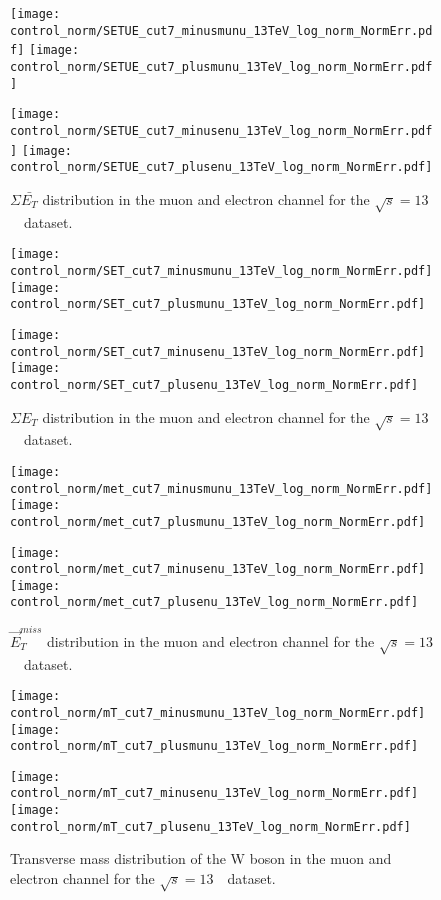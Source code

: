 \begin{figure}[h]
	\centering
	{\texttt{[image: control\_norm/SETUE\_cut7\_minusmunu\_13TeV\_log\_norm\_NormErr.pdf]}\label{f:SETUEmm13}}
	{\texttt{[image: control\_norm/SETUE\_cut7\_plusmunu\_13TeV\_log\_norm\_NormErr.pdf]}\label{f:SETUEpm13}}
	
	{\texttt{[image: control\_norm/SETUE\_cut7\_minusenu\_13TeV\_log\_norm\_NormErr.pdf]}\label{f:}}
	{\texttt{[image: control\_norm/SETUE\_cut7\_plusenu\_13TeV\_log\_norm\_NormErr.pdf]}\label{f:}}
	\caption{$\Sigma \bar{E_T}$ distribution in the muon and electron channel  for the $\sqrt{s} = 13$~\TeV\ dataset.}\end{figure}
%

\begin{figure}[h]
	\centering
	{\texttt{[image: control\_norm/SET\_cut7\_minusmunu\_13TeV\_log\_norm\_NormErr.pdf]}\label{f:set13}}
	{\texttt{[image: control\_norm/SET\_cut7\_plusmunu\_13TeV\_log\_norm\_NormErr.pdf]}\label{f:setpl}}
	
	{\texttt{[image: control\_norm/SET\_cut7\_minusenu\_13TeV\_log\_norm\_NormErr.pdf]}\label{f:}}
	{\texttt{[image: control\_norm/SET\_cut7\_plusenu\_13TeV\_log\_norm\_NormErr.pdf]}\label{f:}}
	\caption{$\Sigma{E_T}$ distribution in the muon and electron channel  for the $\sqrt{s} = 13$~\TeV\ dataset.}\end{figure}



\begin{figure}[h]
	\centering
	{\texttt{[image: control\_norm/met\_cut7\_minusmunu\_13TeV\_log\_norm\_NormErr.pdf]}\label{f:}}
	{\texttt{[image: control\_norm/met\_cut7\_plusmunu\_13TeV\_log\_norm\_NormErr.pdf]}\label{f:}}
	
	{\texttt{[image: control\_norm/met\_cut7\_minusenu\_13TeV\_log\_norm\_NormErr.pdf]}\label{f:}}
	{\texttt{[image: control\_norm/met\_cut7\_plusenu\_13TeV\_log\_norm\_NormErr.pdf]}\label{f:}}
	\caption{ $\vec{E}^{miss}_{T}$ distribution in the muon and electron channel  for the $\sqrt{s} = 13$~\TeV\ dataset. }\end{figure}




\begin{figure}[h]
	\centering
	{\texttt{[image: control\_norm/mT\_cut7\_minusmunu\_13TeV\_log\_norm\_NormErr.pdf]}\label{f:}}
	{\texttt{[image: control\_norm/mT\_cut7\_plusmunu\_13TeV\_log\_norm\_NormErr.pdf]}\label{f:}}
	
	{\texttt{[image: control\_norm/mT\_cut7\_minusenu\_13TeV\_log\_norm\_NormErr.pdf]}\label{f:}}
	{\texttt{[image: control\_norm/mT\_cut7\_plusenu\_13TeV\_log\_norm\_NormErr.pdf]}\label{f:}}
	\caption{  Transverse mass distribution of the W boson in the muon and electron channel  for the $\sqrt{s} = 13$~\TeV\ dataset. }\end{figure}



